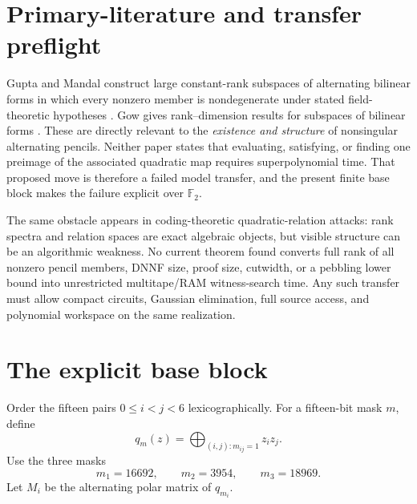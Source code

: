 \documentclass[11pt]{article}
\newcommand{\F}{\mathbb F_2}
\begin{document}
\section{Primary-literature and transfer preflight}
Gupta and Mandal construct large constant-rank subspaces of alternating
bilinear forms in which every nonzero member is nondegenerate under stated
field-theoretic hypotheses \cite{GM}.  Gow gives rank--dimension results for
subspaces of bilinear forms \cite{Gow}.  These are directly relevant to the
\emph{existence and structure} of nonsingular alternating pencils.  Neither
paper states that evaluating, satisfying, or finding one preimage of the
associated quadratic map requires superpolynomial time.  That proposed move
is therefore a failed model transfer, and the present finite base block makes
the failure explicit over $\F$.

The same obstacle appears in coding-theoretic quadratic-relation attacks:
rank spectra and relation spaces are exact algebraic objects, but visible
structure can be an algorithmic weakness.  No current theorem found converts
full rank of all nonzero pencil members, DNNF size, proof size, cutwidth, or a
pebbling lower bound into unrestricted multitape/RAM witness-search time.
Any such transfer must allow compact circuits, Gaussian elimination, full
source access, and polynomial workspace on the same realization.

\section{The explicit base block}
Order the fifteen pairs $0\le i<j<6$ lexicographically.  For a fifteen-bit
mask $m$, define
\[
 q_m(z)=\bigoplus_{(i,j):m_{ij}=1}z_i z_j.
\]
Use the three masks
\[
 m_1=16692,\qquad m_2=3954,\qquad m_3=18969.              \tag{1}
\]
Let $M_i$ be the alternating polar matrix of $q_{m_i}$.
\end{document}
